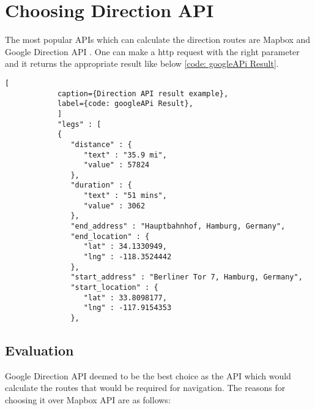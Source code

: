 \section{Choosing Direction API}  
        The most popular APIs which can calculate the direction routes are Mapbox \cite{mapbox} 
        and Google Direction API \cite{googleDirecAPI}. One can make a http request with the 
        right parameter and it returns the appropriate result like below \ref{code: googleAPi Result}.
        \begin{lstlisting}[
            caption={Direction API result example}, 
            label={code: googleAPi Result},
            ]
            "legs" : [
            {
               "distance" : {
                  "text" : "35.9 mi",
                  "value" : 57824
               },
               "duration" : {
                  "text" : "51 mins",
                  "value" : 3062
               },
               "end_address" : "Hauptbahnhof, Hamburg, Germany",
               "end_location" : {
                  "lat" : 34.1330949,
                  "lng" : -118.3524442
               },
               "start_address" : "Berliner Tor 7, Hamburg, Germany",
               "start_location" : {
                  "lat" : 33.8098177,
                  "lng" : -117.9154353
               },  
        \end{lstlisting}
    
        \subsection{Evaluation}
            Google Direction API deemed to be the best choice as the API which
            would calculate the routes that would be required for navigation.
            The reasons for choosing it over Mapbox API are as follows:

